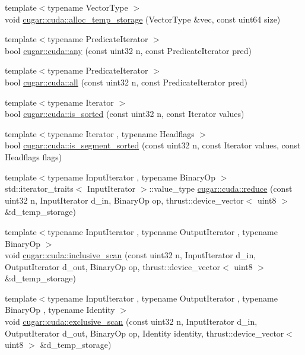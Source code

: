 \begin{DoxyCompactItemize}
\item 
{\footnotesize template$<$typename Vector\+Type $>$ }\\void \hyperlink{group___c_u_d_a_primitives_gafdf4fa3f9edffaa78aefde67918ff47a}{cugar\+::cuda\+::alloc\+\_\+temp\+\_\+storage} (Vector\+Type \&vec, const uint64 size)
\item 
{\footnotesize template$<$typename Predicate\+Iterator $>$ }\\bool \hyperlink{group___c_u_d_a_primitives_ga398b5731f714f21b3161db7aaa34eda2}{cugar\+::cuda\+::any} (const uint32 n, const Predicate\+Iterator pred)
\item 
{\footnotesize template$<$typename Predicate\+Iterator $>$ }\\bool \hyperlink{group___c_u_d_a_primitives_gaaf45a87aabac21eef7be5612e16966bd}{cugar\+::cuda\+::all} (const uint32 n, const Predicate\+Iterator pred)
\item 
{\footnotesize template$<$typename Iterator $>$ }\\bool \hyperlink{group___c_u_d_a_primitives_gad4b97d1c8070f15a448394731a4d340a}{cugar\+::cuda\+::is\+\_\+sorted} (const uint32 n, const Iterator values)
\item 
{\footnotesize template$<$typename Iterator , typename Headflags $>$ }\\bool \hyperlink{group___c_u_d_a_primitives_ga856542d9cd7e9d66569baa37e3966ef6}{cugar\+::cuda\+::is\+\_\+segment\+\_\+sorted} (const uint32 n, const Iterator values, const Headflags flags)
\item 
{\footnotesize template$<$typename Input\+Iterator , typename Binary\+Op $>$ }\\std\+::iterator\+\_\+traits$<$ Input\+Iterator $>$\+::value\+\_\+type \hyperlink{group___c_u_d_a_primitives_ga861c0e403d1c73c5dd9a7f211341c76d}{cugar\+::cuda\+::reduce} (const uint32 n, Input\+Iterator d\+\_\+in, Binary\+Op op, thrust\+::device\+\_\+vector$<$ uint8 $>$ \&d\+\_\+temp\+\_\+storage)
\item 
{\footnotesize template$<$typename Input\+Iterator , typename Output\+Iterator , typename Binary\+Op $>$ }\\void \hyperlink{group___c_u_d_a_primitives_ga41116fe198a9b848c34552d68d5ac22a}{cugar\+::cuda\+::inclusive\+\_\+scan} (const uint32 n, Input\+Iterator d\+\_\+in, Output\+Iterator d\+\_\+out, Binary\+Op op, thrust\+::device\+\_\+vector$<$ uint8 $>$ \&d\+\_\+temp\+\_\+storage)
\item 
{\footnotesize template$<$typename Input\+Iterator , typename Output\+Iterator , typename Binary\+Op , typename Identity $>$ }\\void \hyperlink{group___c_u_d_a_primitives_ga68e5f9a1a94d0062cdf3a5442452da30}{cugar\+::cuda\+::exclusive\+\_\+scan} (const uint32 n, Input\+Iterator d\+\_\+in, Output\+Iterator d\+\_\+out, Binary\+Op op, Identity identity, thrust\+::device\+\_\+vector$<$ uint8 $>$ \&d\+\_\+temp\+\_\+storage)

\end{DoxyCompactItemize}
